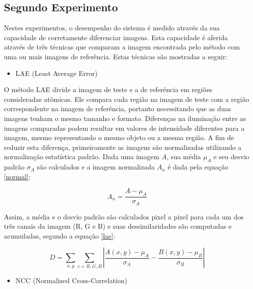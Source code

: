 \subsection{Segundo Experimento}


Nestes experimentos, o desempenho do sistema é medido através da sua capacidade de corretamente diferenciar imagens. Esta capacidade é aferida através de três técnicas que comparam a imagem encontrada pelo método com uma ou mais imagens de referência. Estas técnicas são mostradas a seguir:

\begin{itemize}
\item LAE (Least Average Error)
\end{itemize}


O método LAE divide a imagem de teste e a de referência em regiões consideradas atômicas. Ele compara cada região na imagem de teste com a região correspondente na imagem de referência, portanto necessitando que as duas imagens tenham o mesmo tamanho e formato. Diferenças na iluminação entre as imagens comparadas podem resultar em valores de intensidade diferentes para a imagem, mesmo representando o mesmo objeto ou a mesma região. A fim de reduzir esta diferença, primeiramente as imagens são normalizadas utilizando a normalização estatística padrão. Dada uma imagem $A$, sua média $\mu_A$ e seu desvio padrão $\sigma_A$ são calculados e a imagem normalizada $A_n$ é dada pela equação \ref{normal}:

\begin{equation}
A_n = \frac{A-\mu_A}{\sigma_A} \label{normal}
\end{equation}

Assim, a média e o desvio padrão são calculados pixel a pixel para cada um dos três canais da imagem (R, G e B) e suas dessimilaridades são computadas e acumuladas, segundo a equação \ref{lae}:

\begin{equation}
D = \sum_ {x,y}^{} \sum_{c=R,G,B}^{} \left | \frac{A(x,y)-\mu _A}{\sigma _A} - \frac{B(x,y)-\mu _B}{\sigma _B} \right |
\label{lae}
\end{equation}

\begin{itemize}
\item NCC (Normalized Cross-Correlation)
\end{itemize}

